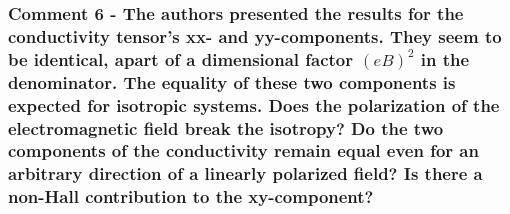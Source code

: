 \documentclass{article}
\begin{document}
\subsubsection*{Comment 6 -
\color{RoyalBlue} The authors presented the results for the conductivity tensor's xx- and yy-components. They seem to be identical, apart of a dimensional factor $(eB)^2$ in the denominator. The equality of these two components is expected for isotropic systems. Does the polarization of the electromagnetic field break the isotropy? Do the two components of the conductivity remain equal even for an arbitrary direction of a linearly polarized field? Is there a non-Hall contribution to the xy-component?
}
\end{document}
